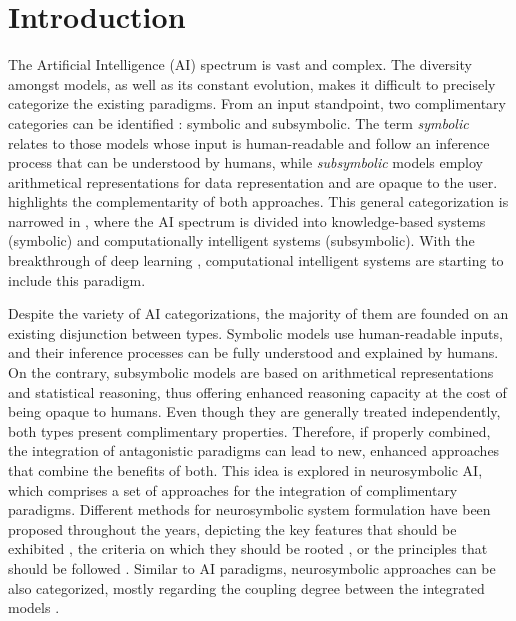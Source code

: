 \chapter{Introduction}
\label{chap:intro}
The Artificial Intelligence (AI) spectrum is vast and complex. The diversity amongst models, as well as its constant evolution, makes it difficult to precisely categorize the existing paradigms. From an input standpoint, two complimentary categories can be identified \citep{lieberman_symbolic_nodate}: symbolic and subsymbolic. The term \textit{symbolic} relates to those models whose input is human-readable and follow an inference process that can be understood by humans, while \textit{subsymbolic} models employ arithmetical representations for data representation and are opaque to the user. \cite{lieberman_symbolic_nodate} highlights the complementarity of both approaches. This general categorization is narrowed in \cite{hopgood_2009_knowledge-based}, where the AI spectrum is divided into knowledge-based systems (symbolic) and computationally intelligent systems (subsymbolic). With the breakthrough of deep learning \citep{raina_2009_gpu,glorot_2014_relu}, computational intelligent systems are starting to include this paradigm. 

Despite the variety of AI categorizations, the majority of them are founded on an existing disjunction between types. Symbolic models use human-readable inputs, and their inference processes can be fully understood and explained by humans. On the contrary, subsymbolic models are based on arithmetical representations and statistical reasoning, thus offering enhanced reasoning capacity at the cost of being opaque to humans. Even though they are generally treated independently, both types present complimentary properties. Therefore, if properly combined, the integration of antagonistic paradigms can lead to new, enhanced approaches that combine the benefits of both. This idea is explored in neurosymbolic AI, which comprises a set of approaches for the integration of complimentary paradigms. Different methods for neurosymbolic system formulation have been proposed throughout the years, depicting the key features that should be exhibited \citep{mcgarry_hybrid_1999}, the criteria on which they should be rooted \citep{mira_neurosymbolic_2004}, or the principles that should be followed \citep{besold_neural-symbolic_2017}. Similar to AI paradigms, neurosymbolic approaches can be also categorized, mostly regarding the coupling degree between the integrated models \citep{medsker2020models,hilario_overview_nodate}.

